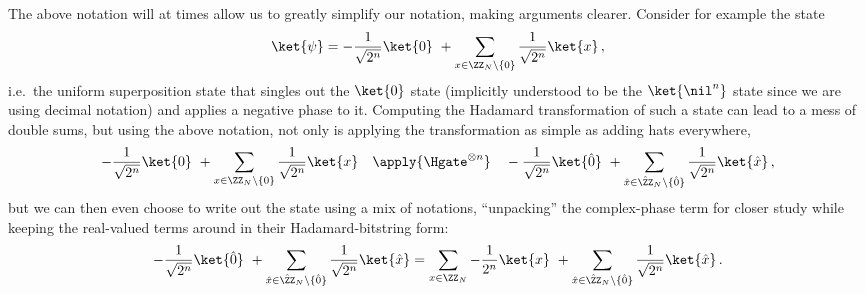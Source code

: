       The above notation will at times allow us to greatly simplify our
        notation, making arguments clearer. Consider for example the state
        \[
          \ket{\psi} = 
          -\frac{1}{\sqrt{2^n}} \ket{0}\
          +
          \sum_{x \in \ZZ_N \backslash \{0\}} 
          \frac{1}{\sqrt{2^n}} \ket{x}\, ,
        \]
        i.e.\ the uniform superposition state that singles out the $\ket{0}$ state (implicitly
        understood to be the $\ket{\nil^n}$ state since we are using decimal notation) 
        and applies a negative phase to it. Computing the Hadamard transformation of
        such a state can lead to a mess of double sums, but using the above
        notation, not only is applying the transformation as simple as adding
        hats everywhere,
        \[
          - \frac{1}{\sqrt{2^n}} \ket{0}\
          +
          \sum_{x \in \ZZ_N \backslash \{0\}} 
          \frac{1}{\sqrt{2^n}} \ket{x}
          \quad
          \apply{\Hgate^{\otimes n}} 
          \quad
          - \frac{1}{\sqrt{2^n}} \ket{\hat{0}}\ +
          \sum_{\hat x \in \hat{\ZZ}_N \backslash \{\hat{0}\}} 
          \frac{1}{\sqrt{2^n}} \ket{\hat{x}}\, ,
        \]
        but we can then even choose to write out the state using a mix of
        notations, ``unpacking'' the complex-phase term for closer study while keeping 
        the real-valued terms around in their Hadamard-bitstring form:
        \[
          -\frac{1}{\sqrt{2^n}} \ket{\hat{0}}\ +
          \sum_{\hat x \in \hat{\ZZ}_N \backslash \{\hat{0}\}} 
          \frac{1}{\sqrt{2^n}} \ket{\hat{x}}
          =
          \sum_{x \in \ZZ_N} -\frac{1}{2^n} \ket{x}\ +
          \sum_{\hat x \in \hat{\ZZ}_N \backslash \{\hat{0}\}} 
          \frac{1}{\sqrt{2^n}} \ket{\hat{x}}\, .
        \]

